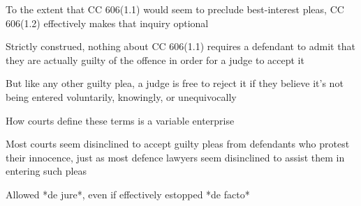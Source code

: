 To the extent that CC 606(1.1) would seem to preclude best-interest pleas, CC 606(1.2) effectively makes that inquiry optional

Strictly construed, nothing about CC 606(1.1) requires a defendant to admit that they are actually guilty of the offence in order for a judge to accept it

But like any other guilty plea, a judge is free to reject it if they believe it's not being entered voluntarily, knowingly, or unequivocally

How courts define these terms is a variable enterprise

Most courts seem disinclined to accept guilty pleas from defendants who protest their innocence, just as most defence lawyers seem disinclined to assist them in entering such pleas

Allowed *de jure*, even if effectively estopped *de facto*